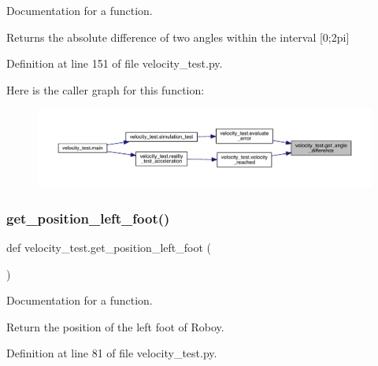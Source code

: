 Documentation for a function. 

Returns the absolute difference of two angles within the interval \mbox{[}0;2pi\mbox{]} 

Definition at line 151 of file velocity\+\_\+test.\+py.


\begin{DoxyCode}{0}

\end{DoxyCode}
Here is the caller graph for this function\+:\nopagebreak
\begin{figure}[H]
\begin{center}
\leavevmode
\includegraphics[width=350pt]{namespacevelocity__test_a3b7c195a552b65290f4344865f48948e_icgraph}
\end{center}
\end{figure}
\mbox{\label{namespacevelocity__test_a21f5b452c3d9983c2f021bf29f1b0381}} 
\subsubsection{\texorpdfstring{get\_position\_left\_foot()}{get\_position\_left\_foot()}}
{\footnotesize\ttfamily def velocity\+\_\+test.\+get\+\_\+position\+\_\+left\+\_\+foot (\begin{DoxyParamCaption}{ }\end{DoxyParamCaption})}



Documentation for a function. 

Return the position of the left foot of Roboy. 

Definition at line 81 of file velocity\+\_\+test.\+py.


